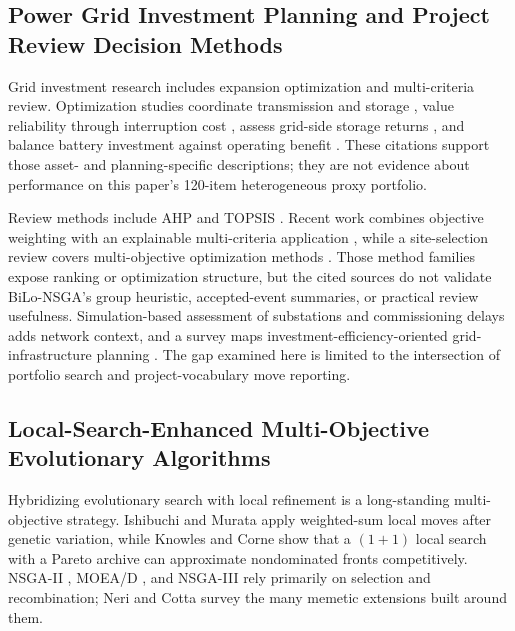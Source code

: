 \documentclass[applsci,article,submit,moreauthors]{Definitions/mdpi}
\begin{document}
\subsection{Power Grid Investment Planning and Project Review Decision Methods}\label{power-grid-investment-planning-and-project-review-decision-methods}

Grid investment research includes expansion optimization and multi-criteria review. Optimization studies coordinate transmission and storage \cite{ref10}, value reliability through interruption cost \cite{ref11}, assess grid-side storage returns \cite{ref12}, and balance battery investment against operating benefit \cite{ref13}. These citations support those asset- and planning-specific descriptions; they are not evidence about performance on this paper's 120-item heterogeneous proxy portfolio.

Review methods include AHP \cite{ref14} and TOPSIS \cite{ref15}. Recent work combines objective weighting with an explainable multi-criteria application \cite{ref16}, while a site-selection review covers multi-objective optimization methods \cite{ref17}. Those method families expose ranking or optimization structure, but the cited sources do not validate BiLo-NSGA's group heuristic, accepted-event summaries, or practical review usefulness. Simulation-based assessment of substations and commissioning delays \cite{ref18} adds network context, and a survey maps investment-efficiency-oriented grid-infrastructure planning \cite{ref19}. The gap examined here is limited to the intersection of portfolio search and project-vocabulary move reporting.

\subsection{Local-Search-Enhanced Multi-Objective Evolutionary Algorithms}\label{local-search-enhanced-multi-objective-evolutionary-algorithms}

Hybridizing evolutionary search with local refinement is a long-standing multi-objective strategy. Ishibuchi and Murata \cite{ref20} apply weighted-sum local moves after genetic variation, while Knowles and Corne \cite{ref21} show that a \((1+1)\) local search with a Pareto archive can approximate nondominated fronts competitively. NSGA-II \cite{ref22}, MOEA/D \cite{ref23}, and NSGA-III \cite{ref24} rely primarily on selection and recombination; Neri and Cotta \cite{ref25} survey the many memetic extensions built around them.
\end{document}
